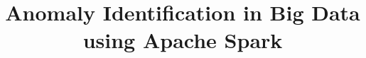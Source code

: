 \documentclass[journal]{IEEEtran}
\begin{document}
%
\title{Anomaly Identification in Big Data using Apache Spark }
%
%
%


% 
%
\end{document}
